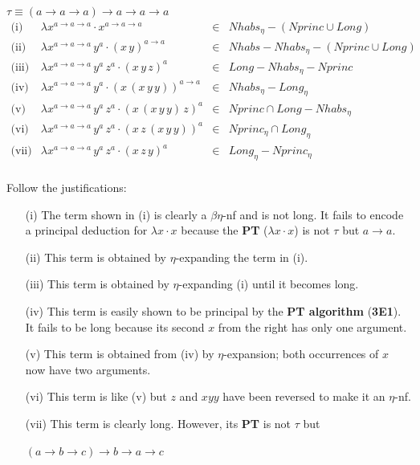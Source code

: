 \documentclass[a4paper,10pt]{article}
\begin{document}
\begin{center}
$\tau \equiv (a\to a\to a)\to a \to a \to a$\\[0.5cm]

$
\begin{array}{rlcl}
\mbox{(i)} & \lambda x^{a\to a \to a} \cdot x^{a\to a \to a} & \in & Nhabs_{\eta} - (Nprinc \cup Long)\\ 
\mbox{(ii)} & \lambda x^{a\to a \to a} \, y^{a} \cdot (x\,y)^{a \to a}& \in & Nhabs - Nhabs_{\eta} - (Nprinc \cup Long)\\ 
\mbox{(iii)} & \lambda x^{a\to a \to a} \, y^{a} \, z^{a} \cdot (x\,y\,z)^{a}& \in & Long - Nhabs_{\eta} - Nprinc\\
\mbox{(iv)} & \lambda x^{a\to a \to a} \, y^{a} \cdot (x\,(x\,y\,y))^{a \to a}& \in & Nhabs_{\eta} - Long_{\eta} \\ 
\mbox{(v)} & \lambda x^{a\to a \to a} \, y^{a} \, z^{a} \cdot (x\,(x\,y\,y)\,z)^{a}& \in & Nprinc \cap Long - Nhabs_{\eta} \\ 
\mbox{(vi)} & \lambda x^{a\to a \to a} \, y^{a} \, z^{a} \cdot (x\,z\,(x\,y\,y))^{a}& \in & Nprinc_{\eta} \cap  Long_{\eta}\\ 
\mbox{(vii)} & \lambda x^{a\to a \to a} \, y^{a} \, z^{a} \cdot (x\,z\,y)^{a}& \in &  Long_{\eta} - Nprinc_{\eta}\\ 
\end{array}
$
\end{center}

Follow the justifications:

\begin{itemize}
 \item [(i)] The term shown in (i) is clearly a $\beta\eta$-nf and is not long. It fails
to encode a principal deduction for $\lambda x\cdot x$ because the \textbf{PT} ($\lambda x\cdot x$) is not $\tau$ but $a\to a$.
 \item [(ii)] This term is obtained by $\eta$-expanding the term in (i).
 \item [(iii)] This term is obtained by $\eta$-expanding (i) until it becomes long.
 \item [(iv)] This term is easily shown to be principal by the \textbf{PT algorithm} (\textbf{3E1}). It fails
to be long because its second $x$ from the right has only one argument.
 \item [(v)] This term is obtained from (iv) by $\eta$-expansion; both occurrences of $x$ now
have two arguments.
 \item [(vi)] This term is like (v) but $z$ and $xyy$ have been reversed to make it an $\eta$-nf.
 \item [(vii)] This term is clearly long. However, its \textbf{PT} is not $\tau$ but
 \begin{center}
  $(a\to b\to c)\to b\to a\to c$
 \end{center}
\end{itemize}
\end{document}
